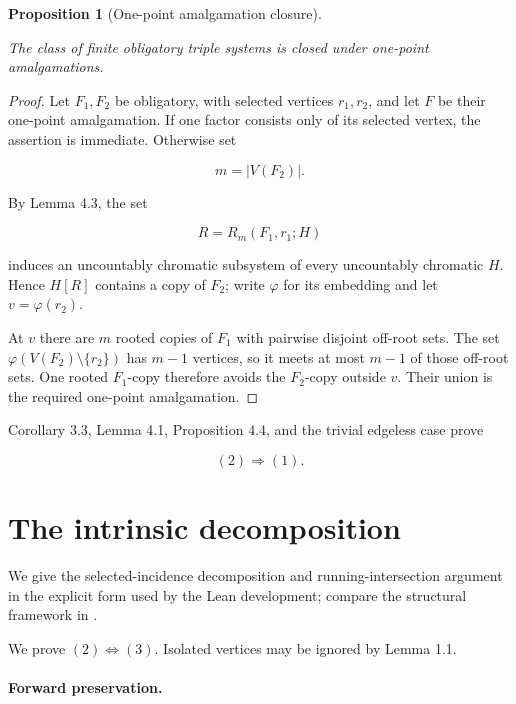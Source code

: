 \documentclass[a4paper,11pt,reqno]{amsart}
\theoremstyle{plain}
\newtheorem{proposition}[theorem]{Proposition}
\theoremstyle{definition}
\theoremstyle{remark}
\begin{document}
\begin{proposition}[One-point amalgamation closure]\label{proposition-4.4-one-point-amalgamation-closure}

The class of finite obligatory triple systems is closed under one-point amalgamations.

\end{proposition}
\begin{proof}
Let \(F_1,F_2\) be obligatory, with selected vertices \(r_1,r_2\), and let \(F\) be their one-point amalgamation. If one factor consists only of its selected vertex, the assertion is immediate. Otherwise set

\[
m=|V(F_2)|.
\]

By Lemma 4.3, the set

\[
R=R_m(F_1,r_1;H)
\]

induces an uncountably chromatic subsystem of every uncountably chromatic \(H\). Hence \(H[R]\) contains a copy of \(F_2\); write \(\varphi\) for its embedding and let \(v=\varphi(r_2)\).

At \(v\) there are \(m\) rooted copies of \(F_1\) with pairwise disjoint off-root sets. The set \(\varphi(V(F_2)\setminus\{r_2\})\) has \(m-1\) vertices, so it meets at most \(m-1\) of those off-root sets. One rooted \(F_1\)-copy therefore avoids the \(F_2\)-copy outside \(v\). Their union is the required one-point amalgamation.
\end{proof}

Corollary 3.3, Lemma 4.1, Proposition 4.4, and the trivial edgeless case prove

\[
(2)\Longrightarrow(1). \tag{4.1}
\]

\section{The intrinsic decomposition}\label{equivalence-of-the-constructive-and-intrinsic-descriptions}

We give the selected-incidence decomposition and running-intersection
argument in the explicit form used by the Lean development; compare the
structural framework in \citet[Sections~4--5]{li2026}.

We prove \((2)\Longleftrightarrow(3)\). Isolated vertices may be ignored by Lemma 1.1.

\paragraph{Forward preservation.}\label{forward-preservation}
\end{document}
